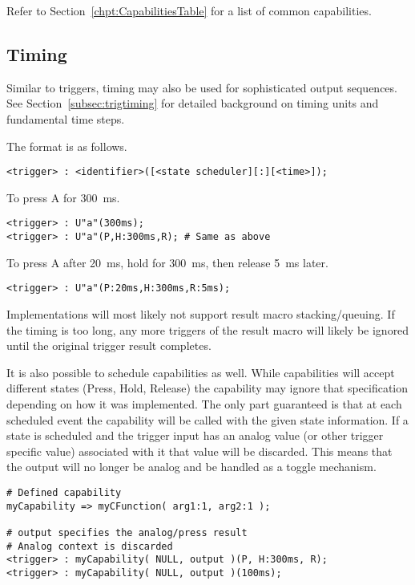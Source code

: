 \documentclass{kiibohd-template}
\begin{document}
Refer to Section~\ref{chpt:CapabilitiesTable} for a list of common capabilities.


\subsection{Timing}
\label{subsec:resulttiming}

Similar to triggers, timing may also be used for sophisticated output sequences.
See Section~\ref{subsec:trigtiming} for detailed background on timing units and fundamental time steps.

The format is as follows.
\begin{lstlisting}
<trigger> : <identifier>([<state scheduler][:][<time>]);
\end{lstlisting}

To press A for 300~ms.

\begin{lstlisting}
<trigger> : U"a"(300ms);
<trigger> : U"a"(P,H:300ms,R); # Same as above
\end{lstlisting}

To press A after 20~ms, hold for 300~ms, then release 5~ms later.

\begin{lstlisting}
<trigger> : U"a"(P:20ms,H:300ms,R:5ms);
\end{lstlisting}

Implementations will most likely not support result macro stacking/queuing.
If the timing is too long, any more triggers of the result macro will likely be ignored until the original trigger result completes.

It is also possible to schedule capabilities as well.
While capabilities will accept different states (Press, Hold, Release) the capability may ignore that specification depending on how it was implemented.
The only part guaranteed is that at each scheduled event the capability will be called with the given state information.
If a state is scheduled and the trigger input has an analog value (or other trigger specific value) associated with it that value will be discarded.
This means that the output will no longer be analog and be handled as a toggle mechanism.

\begin{lstlisting}
# Defined capability
myCapability => myCFunction( arg1:1, arg2:1 );

# output specifies the analog/press result
# Analog context is discarded
<trigger> : myCapability( NULL, output )(P, H:300ms, R);
<trigger> : myCapability( NULL, output )(100ms);
\end{lstlisting}
\end{document}
